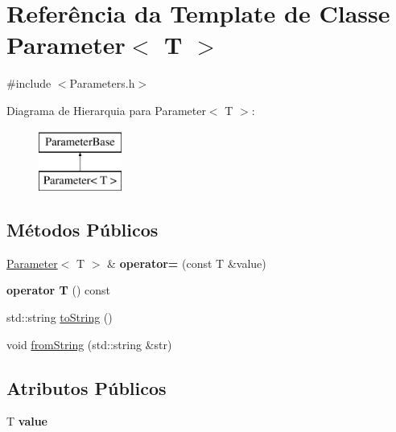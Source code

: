 \hypertarget{class_parameter}{\section{Referência da Template de Classe Parameter$<$ T $>$}
\label{class_parameter}
}


{\ttfamily \#include $<$Parameters.\-h$>$}

Diagrama de Hierarquia para Parameter$<$ T $>$\-:\begin{figure}[H]
\begin{center}
\leavevmode
\includegraphics[height=2.000000cm]{class_parameter}
\end{center}
\end{figure}
\subsection*{Métodos Públicos}
\begin{DoxyCompactItemize}
\item 
\hypertarget{class_parameter_a39b75c306257fc9c27349e0b01a11849}{\hyperlink{class_parameter}{Parameter}$<$ T $>$ \& {\bfseries operator=} (const T \&value)}\label{class_parameter_a39b75c306257fc9c27349e0b01a11849}

\item 
\hypertarget{class_parameter_a3b15484d6beb0b7379a1c3ae987ecb59}{{\bfseries operator T} () const }\label{class_parameter_a3b15484d6beb0b7379a1c3ae987ecb59}

\item 
std\-::string \hyperlink{class_parameter_ad9328613b3f031c33ebc89e0a78356c6}{to\-String} ()
\item 
void \hyperlink{class_parameter_ab8b07f5fd7288b6803eae054f4586c32}{from\-String} (std\-::string \&str)
\end{DoxyCompactItemize}
\subsection*{Atributos Públicos}
\begin{DoxyCompactItemize}
\item 
\hypertarget{class_parameter_a5dcbb3f478f204d7931eec2b3ed66117}{T {\bfseries value}}\label{class_parameter_a5dcbb3f478f204d7931eec2b3ed66117}

\end{DoxyCompactItemize}
